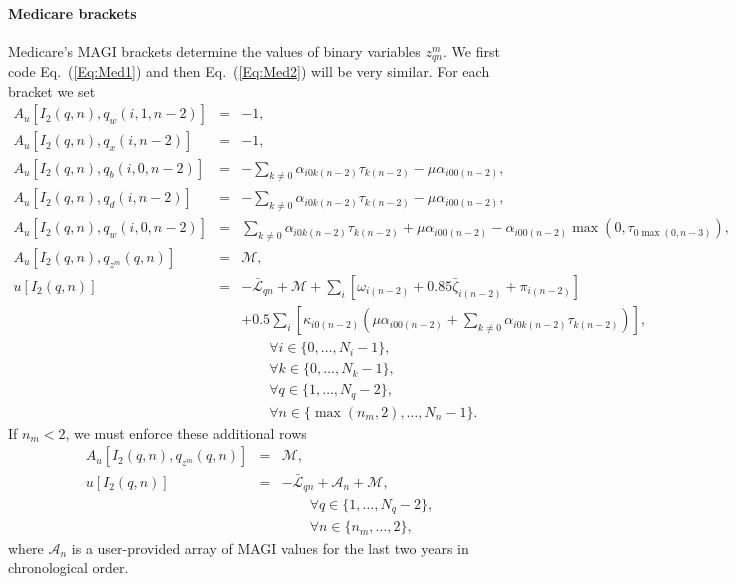 \documentclass{report}[fleqn,11pt]
\begin{document}
\paragraph*{Medicare brackets}
Medicare's MAGI brackets determine the values of binary variables $z^m_{qn}$.
We first code Eq.~(\ref{Eq:Med1}) and then Eq.~(\ref{Eq:Med2}) will be very similar.
For each bracket we set
\begin{eqnarray}
	A_u[I_2(q, n), q_{w}(i, 1, n-2)] &=& -1, \nonumber \\
	A_u[I_2(q, n), q_{x}(i, n-2)] &=& -1, \nonumber \\
	A_u[I_2(q, n), q_{b}(i, 0, n-2)] &=&
	    -\sum_{k\neq 0} \alpha_{i0k(n-2)}\tau_{k(n-2)} - \mu \alpha_{i00(n-2)},
	    \nonumber \\
	A_u[I_2(q, n), q_{d}(i, n-2)] &=&
	    -\sum_{k\neq 0} \alpha_{i0k(n-2)}\tau_{k(n-2)} - \mu \alpha_{i00(n-2)},
	    \nonumber \\
	A_u[I_2(q, n), q_{w}(i, 0, n-2)] &=&
	    \sum_{k\neq 0} \alpha_{i0k(n-2)}\tau_{k(n-2)} + \mu \alpha_{i00(n-2)}
	    - \alpha_{i00(n-2)}\max(0, \tau_{0\max(0, n-3)}), \nonumber \\
	A_u[I_2(q, n), q_{z^m}(q, n)] &=& \mathcal{M}, \nonumber \\
	u[I_2(q, n)] &=& -\bar{\mathcal{L}}_{qn} + \mathcal{M}
         + \sum_i \left[\omega_{i(n-2)} + 0.85\bar{\zeta}_{i(n-2)} + \pi_{i(n-2)} \right]\nonumber \\
	&& + 0.5 \sum_i \left[\kappa_{i0(n-2)}  \left(
	  \mu\alpha_{i00(n-2)} + \sum_{k\neq 0} \alpha_{i0k(n-2)}\tau_{k(n-2)}
	  \right)\right],\nonumber\\
	&&\qquad\forall i \in \{0,\ldots, N_i - 1\}, \nonumber\\
	&&\qquad\forall k \in \{0,\ldots, N_k - 1\}, \nonumber\\
	&&\qquad\forall q \in \{1,\ldots, N_q - 2\}, \nonumber\\
	&&\qquad\forall n \in \{\max(n_m, 2),\ldots, N_n - 1\}.
\end{eqnarray}
If $n_m < 2$, we must enforce these additional rows
\begin{eqnarray}
	A_u[I_2(q, n), q_{z^m}(q, n)] &=& \mathcal{M}, \nonumber \\
	u[I_2(q, n)] &=& -\bar{\mathcal{L}}_{qn} + \mathcal{A}_{n} + \mathcal{M}, \nonumber \\
	&&\qquad\forall q \in \{1,\ldots, N_q - 2\}, \nonumber\\
	&&\qquad\forall n \in \{n_m,\ldots, 2\},
\end{eqnarray}
where $\mathcal{A}_n$ is a user-provided array of MAGI values for the last two years in chronological order.
\end{document}
